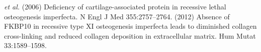 \begin{biblio}[Referencies]
 \textit{et al.} (2006) Deficiency
                    of cartilage-associated protein in recessive lethal osteogenesis imperfecta. N
                    Engl J Med 355:2757–2764.
 (2012) Absence of FKBP10 in recessive type XI
                    osteogenesis imperfecta leads to diminished collagen cross-linking and reduced
                    collagen deposition in extracellular matrix. Hum Mutat
                    33:1589–1598.

\end{biblio}
